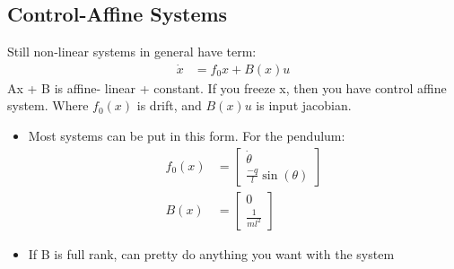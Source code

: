 \documentclass[11pt]{article}
\begin{document}
\subsection{Control-Affine Systems}
Still non-linear systems in general have term:
\begin{align*}
    \dot{x} &= f_0{x} + B(x)u
\end{align*}
Ax + B is affine- linear + constant. If you freeze x, then you have control affine system. Where $f_0(x)$ is drift, and $B(x)u$ is input jacobian. 
\begin{itemize}
    \item Most systems can be put in this form. For the pendulum:
    \begin{align*}
        f_0(x) &= \begin{bmatrix}
            \dot{\theta} \\
            \frac{-q}{l}\sin(\theta)
        \end{bmatrix}
            \\
            B(x) &= \begin{bmatrix}
                0 \\
                \frac{1}{ml^2}
            \end{bmatrix}
    \end{align*}
    \item If B is full rank, can pretty do anything you want with the system
\end{itemize}
\end{document}
